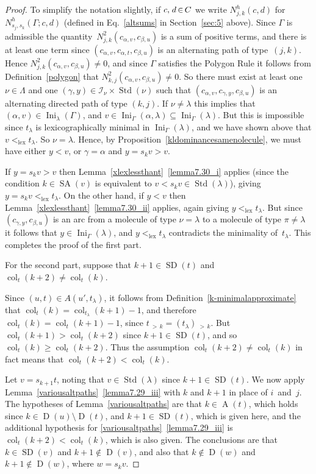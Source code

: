 \documentclass[10pt]{amsart}
\theoremstyle{definition}
\DeclareMathOperator{\Ini}{Ini}
\DeclareMathOperator{\lex}{lex}
\DeclareMathOperator{\col}{col}
\newcommand{\morethan}[2]{#1\,{_{>\,#2}}}
\DeclareMathOperator{\STD}{Std}
\DeclareMathOperator{\SD}{SD}
\DeclareMathOperator{\SA}{SA}
\DeclareMathOperator{\D}{D}
\DeclareMathOperator{\A}{A}
\newcommand*{\mk}{\mkern -1mu}
\newcommand*{\Mk}{\mkern -2mu}
\begin{document}
\begin{proof}
To simplify the notation slightly, if $c,\,\mk d \Mk \in \Mk C$ we write
$N^h_{j,k}(c,d)$ for $N^h_{s_j,s_k}(\Gamma;c,d)$ (de\-fined in Eq.~\eqref{altsums}
in Section~\ref{sec:5} above). Since $\Gamma$ is admissible the quantity~$N^{2}_{j,k}(c_{\alpha,v},c_{\beta,u})$ is a sum of positive terms, and there
is at least one term since $(c_{\alpha,v},c_{\alpha,t},c_{\beta,u})$ is an
alternating path of type~$(j,k)$. Hence
$N^{2}_{j,k}(c_{\alpha,v},c_{\beta,u})\ne0$, and since $\Gamma$ satisfies
the Polygon Rule it follows from Definition~\ref{polygon} that
$N^{2}_{k,j}(c_{\alpha,v},c_{\beta,u})\ne0$. So there must exist at least
one $\nu\in\Lambda$ and one
$(\gamma,y)\in\mathcal{I}_{\nu}\times\STD(\nu)$
such that $(c_{\alpha,v},c_{\gamma,y},c_{\beta,u})$ is an alternating directed
path of type $(k,j)$. If $\nu\ne\lambda$ this implies that
$(\alpha,v)\in\Ini_\lambda(\Gamma)$, and
$v\in\Ini_\Gamma(\alpha,\lambda)\subseteq\Ini_\Gamma(\lambda)$.
But this is impossible since $t_\lambda$ is lexicographically minimal
in $\Ini_\Gamma(\lambda)$, and we have shown above that $v<_{\lex}t_\lambda$.
So $\nu=\lambda$. Hence, by Proposition~\ref{kldominancesamenolecule}, we must
have either $y<v$, or $\gamma=\alpha$ and $y=s_kv>v$.

If $y=s_kv>v$ then Lemma~\ref{xlexlessthant}~\ref{lemma7.30_i} applies (since the condition
$k\in\SA(v)$ is equivalent to $v<s_kv\in\STD(\lambda)$),
giving $y=s_kv <_{\lex}t_\lambda$. On the other hand, if $y<v$ then
Lemma~\ref{xlexlessthant}~\ref{lemma7.30_ii} applies, again giving $y<_{\lex}t_\lambda$.
But since $(c_{\gamma,y},c_{\beta,u})$ is an arc from a molecule of type $\nu=\lambda$
to a molecule of type $\pi\ne\lambda$ it follows that
$y\in\Ini_\Gamma(\lambda)$, and $y<_{\lex}t_\lambda$ contradicts the
minimality of~$t_\lambda$. This completes
the proof of the first part.

For the second part, suppose that $k+1\in\SD(t)$ and
$\col_t(k+2)\neq\col_t(k)$.

Since $(u,t)\in A(u',t_\lambda)$, it follows from Definition~\ref{k-minimalapproximate}
that $\col_t(k)=\col_{t_\lambda}(k+1)-1$, and therefore
$\col_t(k)=\col_t(k+1)-1$, since $\morethan tk=\morethan{(t_\lambda)}k$.
But $\col_t(k+1)>\col_t(k+2)$ since $k+1\in\SD(t)$, and so
$\col_t(k)\geqslant\col_t(k+2)$. Thus the assumption $\col_t(k+2)\neq\col_t(k)$
in fact means that $\col_t(k+2)<\col_t(k)$.

Let $v=s_{k+1}t$, noting that $v\in\STD(\lambda)$ since $k+1\in\SD(t)$.
We now apply Lemma~\ref{variousaltpaths}~\ref{lemma7.29_iii} with $k$ and $k+1$ in place
of $i$~and~$j$. The hypotheses of Lemma~\ref{variousaltpaths} are that
$k\in\A(t)$, which holds since $k\in\D(u)\setminus\D(t)$, and
$k+1\in\SD(t)$, which is given here, and the additional hypothesis
for \ref{variousaltpaths}~\ref{lemma7.29_iii} is $\col_t(k+2)<\col_t(k)$, which is
also given. The conclusions are that $k\in\SD(v)$ and $k+1\notin\D(v)$,
and also that $k\notin\D(w)$ and $k+1\notin\D(w)$, where $w=s_kv$.


\end{proof}
\end{document}
